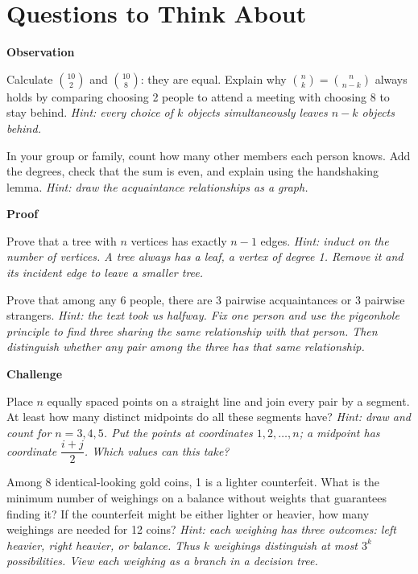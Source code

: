 \section*{Questions to Think About}

\textbf{Observation}
\begin{sikao}
\item Calculate $\binom{10}{2}$ and $\binom{10}{8}$: they are equal. Explain why $\binom{n}{k}=\binom{n}{n-k}$ always holds by comparing choosing 2 people to attend a meeting with choosing 8 to stay behind. \emph{Hint: every choice of $k$ objects simultaneously leaves $n-k$ objects behind.}
\item In your group or family, count how many other members each person knows. Add the degrees, check that the sum is even, and explain using the handshaking lemma. \emph{Hint: draw the acquaintance relationships as a graph.}
\end{sikao}

\textbf{Proof}
\begin{sikao}
\item Prove that a tree with $n$ vertices has exactly $n-1$ edges. \emph{Hint: induct on the number of vertices. A tree always has a leaf, a vertex of degree 1. Remove it and its incident edge to leave a smaller tree.}
\item Prove that among any 6 people, there are 3 pairwise acquaintances or 3 pairwise strangers. \emph{Hint: the text took us halfway. Fix one person and use the pigeonhole principle to find three sharing the same relationship with that person. Then distinguish whether any pair among the three has that same relationship.}
\end{sikao}

\textbf{Challenge}
\begin{sikao}
\item Place $n$ equally spaced points on a straight line and join every pair by a segment. At least how many distinct midpoints do all these segments have? \emph{Hint: draw and count for $n=3,4,5$. Put the points at coordinates $1,2,\dots,n$; a midpoint has coordinate $\dfrac{i+j}{2}$. Which values can this take?}
\item Among 8 identical-looking gold coins, 1 is a lighter counterfeit. What is the minimum number of weighings on a balance without weights that guarantees finding it? If the counterfeit might be either lighter or heavier, how many weighings are needed for 12 coins? \emph{Hint: each weighing has three outcomes: left heavier, right heavier, or balance. Thus $k$ weighings distinguish at most $3^k$ possibilities. View each weighing as a branch in a decision tree.}
\end{sikao}

